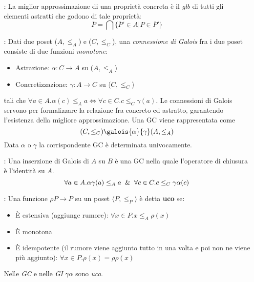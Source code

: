\documentclass[a4paper, 10pt]{book}
\newenvironment{definition}[1][Definizione]{\begin{trivlist}
\item[\hskip \labelsep {\bfseries #1}]}{\end{trivlist}}
\begin{document}
    \begin{definition}[Miglior astrazione]: La miglior approssimazione di una proprietà concreta è il \emph{glb}
            di tutti gli elementi astratti che godono di tale proprietà:
            $$\overline{P} = \bigcap\{\overline{P}' \in A | P \in \overline{P}' \}$$
    \end{definition}
    
    \begin{definition}[Galois connections]: Dati due poset ($A, \leq_A$) e ($C, \leq_C$), una 
        \emph{connessione di Galois} fra i due poset consiste di due funzioni \emph{monotone}:
        \begin{itemize}
            \item Astrazione: $\alpha : C \to A$ su ($A, \leq_A$)
            \item Concretizzazione: $\gamma : A \to C$ su ($C, \leq_C$)
        \end{itemize}
            tali che $\forall a \in A.\alpha(c) \leq_A a \Leftrightarrow \forall c \in C.c \leq_C \gamma(a)$.
            Le connessioni di Galois servono per formalizzare la relazione fra concreto ed astratto, garantendo
            l'esistenza della migliore approssimazione. Una GC viene rappresentata come
            $$(C, \leq_C)\galois{\alpha}{\gamma}(A, \leq_A)$$
            Data $\alpha$ o $\gamma$ la corrispondente GC è determinata univocamente.
    \end{definition}
    
    \begin{definition}[Galois insertions]: Una inserzione di Galois di $A$ su $B$ è una GC nella quale l'operatore di
        chiusura è l'identità su $A$.
        $$\forall a \in A.\alpha\gamma(a) \leq_A a \And \forall c \in C.c \leq_C \gamma\alpha(c)$$
        
    \end{definition}
    
    \begin{definition}[Upper closure operators] : Una funzione $\rho P \to P$ su un poset 
        $\langle P, \leq_P \rangle$ è detta \textbf{uco} se:
        \begin{itemize}
            \item È estensiva (aggiunge rumore): $\forall x \in P.x \leq_A \rho(x)$
            \item È monotona
            \item È idempotente (il rumore viene aggiunto tutto in una volta e poi non ne viene più aggiunto):
                $\forall x \in P.\rho(x) = \rho\rho(x)$
        \end{itemize}
        Nelle \emph{GC} e nelle \emph{GI} $\gamma\alpha$ sono \emph{uco}.
    \end{definition}
    
\end{document}
